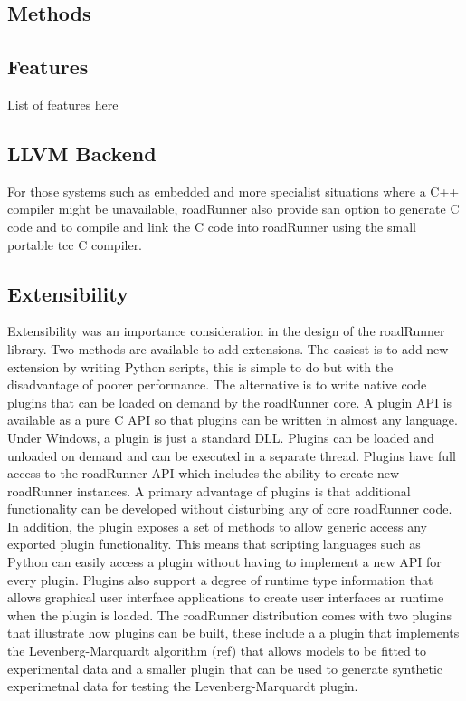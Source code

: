 \documentclass{bioinfo}
\begin{document}
\begin{methods}
\section{Methods}

\subsection{Features}

List of features here

\subsection{LLVM Backend}

For those systems such as embedded and more specialist situations where a C++ compiler might be unavailable, roadRunner also provide san option to generate C code and to compile and link the C code into roadRunner using the small portable tcc C compiler.


\subsection{Extensibility}

Extensibility was an importance consideration in the design of the roadRunner library. Two methods are available to add extensions. The easiest is to add new extension by writing Python scripts, this is simple to do but with the disadvantage of poorer performance. The alternative is to write native code plugins that can be loaded on demand by the roadRunner core. A plugin API is available as a pure C API so that plugins can be written in almost any language. Under Windows, a plugin is just a standard DLL. Plugins can be loaded and unloaded on demand and can be executed in a separate thread. Plugins have full access to the roadRunner API which includes the ability to create new roadRunner instances. A primary advantage of plugins is that additional functionality can be developed without disturbing any of core roadRunner code. In addition, the plugin exposes a set of methods to allow generic access any exported plugin functionality. This means that scripting languages such as Python can easily access a plugin without having to implement a new API for every plugin. Plugins also support a degree of runtime type information that allows graphical user interface applications to create user interfaces ar runtime when the plugin is loaded. The roadRunner distribution comes with two plugins that illustrate how plugins can be built, these include a a plugin that implements the Levenberg-Marquardt algorithm (ref) that allows models to be fitted to experimental data and a smaller plugin that can be used to generate synthetic experimetnal data for testing the Levenberg-Marquardt plugin.


\end{methods}
\end{document}
